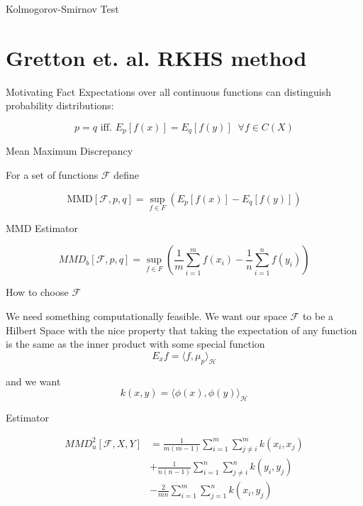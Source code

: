 \documentclass{beamer}
\begin{document}
\begin{frame}{Kolmogorov-Smirnov Test}

\end{frame}


\section{Gretton et. al. RKHS method}
\begin{frame}{Motivating Fact}
 Expectations over all continuous functions can distinguish probability distributions:
 
 $$p = q \text{ iff. }  E_p[f(x)] = E_q[f(y)] \;\; \forall f \in C(X)$$
\end{frame}

\begin{frame}
{Mean Maximum Discrepancy}

For a set of functions $\mathcal{F}$ define

$$\text{MMD}[\mathcal{F}, p , q] = \sup_{f \in F} ( E_p[f(x)] - E_q[f(y)] )$$
\end{frame}

\begin{frame}
{MMD Estimator}

$$MMD_b [\mathcal{F}, p , q] = \sup_{f \in F} ( \frac 1m \sum_{i = 1}^m f(x_i) - \frac 1n \sum_{i = 1}^n f(y_i) )$$
\end{frame}

\begin{frame}
{How to choose $\mathcal{F}$}

We need something computationally feasible. We want our space $\mathcal{F}$ to be a Hilbert Space with the nice property that taking the expectation of any function is the same as the inner product with some special function 
$$E_xf = \langle f, \mu_p\rangle_\mathcal{H}$$

and we want $$k(x, y) = \langle \phi(x) , \phi(y) \rangle_\mathcal{H}$$

\end{frame}

\begin{frame}{Estimator}

\begin{align*}
{MMD}^2_u[\mathcal{F}, X, Y] &= \frac{1}{m(m-1)}\sum_{i=1}^m\sum_{j \neq i}^m k(x_i, x_j)\\
 &+ \frac{1}{n(n-1)}\sum_{i=1}^n \sum_{j \neq i}^n k(y_i, y_j) \\
 &- \frac{2}{mn}\sum_{i = 1}^m \sum_{j = 1}^n k(x_i, y_j)
\end{align*}  

\end{frame}
\end{document}

